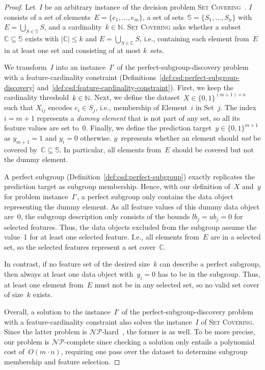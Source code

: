 \documentclass[acmsmall]{acmart} %
\theoremstyle{acmplain}
\theoremstyle{acmdefinition}
\begin{document}
\begin{proof}
	Let~$I$ be an arbitrary instance of the decision problem \textsc{Set Covering}~\cite{karp1972reducibility}.
	$I$ consists of a set of elements~$E = \{e_1, \dots, e_m\}$, a set of sets~$\mathbb{S} = \{S_1, \dots, S_n\}$ with $E = \bigcup_{S \in \mathbb{S}} S$, and a cardinality~$k \in \mathbb{N}$.
	\textsc{Set Covering} asks whether a subset $\mathbb{C} \subseteq \mathbb{S}$ exists with $|\mathbb{C}| \leq k$ and $E = \bigcup_{S \in \mathbb{C}} S$, i.e., containing each element from~$E$ in at least one set and consisting of at most $k$~sets.
	
	We transform~$I$ into an instance~$I'$ of the perfect-subgroup-discovery problem with a feature-cardinality constraint (Definitions~\ref{def:csd:perfect-subgroup-discovery} and~\ref{def:csd:feature-cardinality-constraint}).
	First, we keep the cardinality threshold~$k \in \mathbb{N}$.
	Next, we define the dataset~$X \in \{0, 1\}^{(m + 1) \times n}$ such that $X_{ij}$ encodes $e_i \in S_j$, i.e., membership of Element~$i$ in Set~$j$.
	The index $i = m + 1$ represents a \emph{dummy element} that is not part of any set, so all its feature values are set to~0.
	Finally, we define the prediction target~$y \in \{0, 1\}^{m+1}$ as $y_{m+1} = 1$ and $y_i = 0$ otherwise.
	$y$~represents whether an element should \emph{not} be covered by~$\mathbb{C} \subseteq \mathbb{S}$.
	In particular, all elements from~$E$ should be covered but not the dummy element.
	
	A perfect subgroup (Definition~\ref{def:csd:perfect-subgroup}) exactly replicates the prediction target as subgroup membership.
	Hence, with our definition of~$X$ and~$y$ for problem instance~$I'$, a perfect subgroup only contains the data object representing the dummy element.
	As all feature values of this dummy data object are~0, the subgroup description only consists of the bounds $\mathit{lb}_j = \mathit{ub}_j = 0$ for selected features.
	Thus, the data objects excluded from the subgroup assume the value~1 for at least one selected feature.
	I.e., all elements from~$E$ are in a selected set, so the selected features represent a set cover~$\mathbb{C}$.

	In contrast, if no feature set of the desired size~$k$ can describe a perfect subgroup, then always at least one data object with~$y_i = 0$ has to be in the subgroup.
	Thus, at least one element from~$E$ must not be in any selected set, so no valid set cover of size~$k$ exists.
	
	Overall, a solution to the instance~$I'$ of the perfect-subgroup-discovery problem with a feature-cardinality constraint also solves the instance~$I$ of \textsc{Set Covering}.
	Since the latter problem is $\mathcal{NP}$-hard~\cite{karp1972reducibility}, the former is as well.
	To be more precise, our problem is $\mathcal{NP}$-complete since checking a solution only entails a polynomial cost of~$O(m \cdot n)$, requiring one pass over the dataset to determine subgroup membership and feature selection.
\end{proof}
\end{document}
